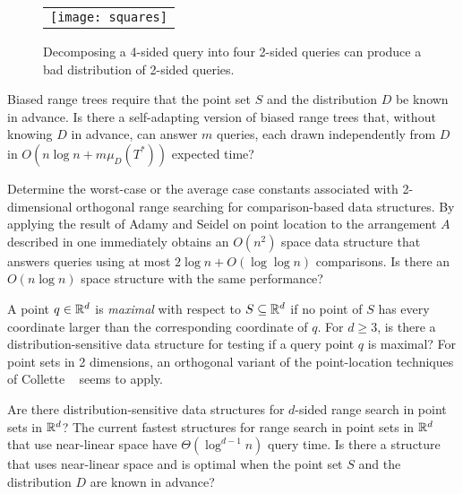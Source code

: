 \documentclass[charterfonts]{patmorin}
\begin{document}
\begin{figure}
  \begin{center}
    \begin{tabular}{c}
      \texttt{[image: squares]}
    \end{tabular}
  \end{center}
  \caption{Decomposing a 4-sided query into four 2-sided queries can
           produce a bad distribution of 2-sided queries.}
\end{figure}



\begin{op}
Biased range trees require that the point set $S$ and the
distribution $D$ be known in advance.  Is
there a self-adapting version of biased range trees that, without
knowing $D$ in advance, can answer $m$ queries, each drawn
independently from $D$ in $O(n\log n+ m\mu_D(T^*))$ expected time?
\end{op}

\begin{op}
Determine the worst-case or the average case constants associated with
2-dimensional orthogonal range searching for comparison-based data structures.
By applying the result of Adamy and Seidel \cite{as98} on point
location to the arrangement $A$ described in  one
immediately obtains an $O(n^2)$ space data structure that answers
queries using at most $2\log n + O(\log\log n)$ comparisons.  Is there
an $O(n\log n)$ space structure with the same performance?
\end{op}

\begin{op}
A point $q\in \mathbb{R}^d$ is \emph{maximal} with respect to $S\subseteq\mathbb{R}^d$
if no point of $S$ has every coordinate larger than the corresponding
coordinate of $q$. For $d\ge 3$,  is there a distribution-sensitive 
data structure for
testing if a query point $q$ is maximal?  For point sets in 2
dimensions, an orthogonal variant of the point-location techniques of Collette
\etal\ \cite{cdilm08} seems to apply. 
\end{op}


\begin{op}
Are there distribution-sensitive data structures for $d$-sided range
search in point sets in $\mathbb{R}^d$?  The current fastest structures
for range search in point sets in $\mathbb{R}^d$ that use near-linear space have
$\Theta(\log^{d-1} n)$ query time.  Is there a structure that uses
near-linear space and is optimal
when the point set $S$ and the distribution $D$ are known in advance?
\end{op}



\end{document}
